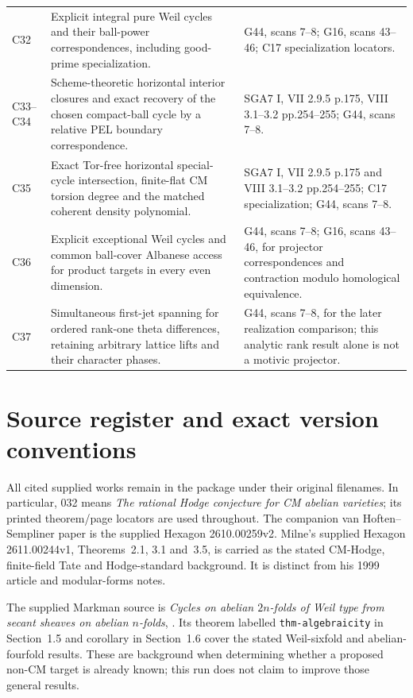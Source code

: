 \begin{longtable}{@{}p{.18\linewidth}p{.48\linewidth}p{.27\linewidth}@{}}
C32 & Explicit integral pure Weil cycles and their ball-power correspondences, including good-prime specialization. & G44, scans 7--8; G16, scans 43--46; C17 specialization locators.\\
C33--C34 & Scheme-theoretic horizontal interior closures and exact recovery of the chosen compact-ball cycle by a relative PEL boundary correspondence. & SGA7 I, VII 2.9.5 p.175, VIII 3.1--3.2 pp.254--255; G44, scans 7--8.\\
C35 & Exact Tor-free horizontal special-cycle intersection, finite-flat CM torsion degree and the matched coherent density polynomial. & SGA7 I, VII 2.9.5 p.175 and VIII 3.1--3.2 pp.254--255; C17 specialization; G44, scans 7--8.\\
C36 & Explicit exceptional Weil cycles and common ball-cover Albanese access for product targets in every even dimension. & G44, scans 7--8; G16, scans 43--46, for projector correspondences and contraction modulo homological equivalence.\\
C37 & Simultaneous first-jet spanning for ordered rank-one theta differences, retaining arbitrary lattice lifts and their character phases. & G44, scans 7--8, for the later realization comparison; this analytic rank result alone is not a motivic projector.\\
\bottomrule
\end{longtable}

\section{Source register and exact version conventions}

All cited supplied works remain in the package under their original
filenames. In particular, 032 means
\emph{The rational Hodge conjecture for CM abelian varieties}; its
printed theorem/page locators are used throughout. The companion
van Hoften--Sempliner paper is the supplied Hexagon 2610.00259v2.
Milne's supplied Hexagon 2611.00244v1, Theorems~2.1, 3.1 and~3.5,
is carried as the stated CM-Hodge, finite-field Tate and Hodge-standard
background. It is distinct from his 1999 article and modular-forms notes.

The supplied Markman source is \emph{Cycles on abelian $2n$-folds of
Weil type from secant sheaves on abelian $n$-folds},
.
Its theorem labelled \texttt{thm-algebraicity} in Section~1.5 and
corollary in Section~1.6 cover the stated Weil-sixfold and
abelian-fourfold results. These are background when determining
whether a proposed non-CM target is already known; this run does
not claim to improve those general results.

